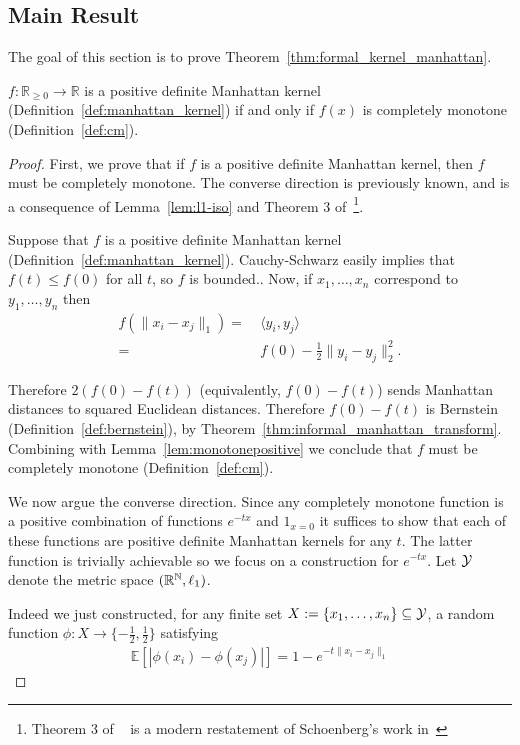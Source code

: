 \subsection{Main Result}\label{sec:bern:main}

The goal of this section is to prove Theorem~\ref{thm:formal_kernel_manhattan}.
\begin{theorem} \label{thm:formal_kernel_manhattan} 
  $f:\mathbb R_{\geq 0}\to \mathbb R$
  is a positive definite Manhattan kernel (Definition~\ref{def:manhattan_kernel}) if and only if
  $f(x)$ is completely monotone (Definition~\ref{def:cm}). 
\end{theorem}
\begin{proof}

First, we prove that if $f$ is a positive definite Manhattan kernel, then $f$ must be completely monotone.  The converse direction is previously known, and is a consequence of Lemma~\ref{lem:l1-iso} and Theorem 3 of~\cite{sow01}\footnote{Theorem 3 of ~\cite{sow01} is a modern restatement of Schoenberg's work in~\cite{s42}}.

Suppose that $f$ is a positive definite Manhattan kernel (Definition~\ref{def:manhattan_kernel}). Cauchy-Schwarz easily implies that $f(t)\leq f(0)$ for all $t$, so $f$ is bounded.. Now, if $x_1,\dots, x_n$ correspond to $y_1,\dots,y_n$ then
\begin{align*}
f(\|x_i-x_j\|_1)
= & ~ \langle y_i,y_j\rangle \\
= & ~ f(0)-\frac{1}{2} \|y_i-y_j\|_2^2. 
\end{align*}

Therefore $2(f(0)-f(t))$ (equivalently, $f(0)-f(t)$) sends Manhattan distances to squared Euclidean distances. Therefore $f(0)-f(t)$ is Bernstein (Definition~\ref{def:bernstein}), by Theorem~\ref{thm:informal_manhattan_transform}. Combining with Lemma~\ref{lem:monotonepositive} we conclude that $f$ must be completely monotone (Definition~\ref{def:cm}). 

\iffalse
We now argue the converse direction. Since any completely monotone function is a positive combination of functions $e^{-tx}$ and $1_{x=0}$ it suffices to show that each of these functions are positive definite Manhattan kernels for any $t$. The latter function is trivially achievable so we focus on a construction for $e^{-tx}$.  
Let ${\cal Y}$ denote the metric space $({\mathbb R}^{\mathbb{N}}, \ell_1)$. 

Indeed we just constructed, for any finite set $X:=\{x_1,\dots,x_n\}\subseteq {\cal Y}$, a random function $\phi:X\to \{-\frac{1}{2},\frac{1}{2}\}$ satisfying 
\begin{align*}
\mathbb E[|\phi(x_i)-\phi(x_j)|]=1-e^{-t \| x_i - x_j \|_1}
\end{align*}


\end{proof}
